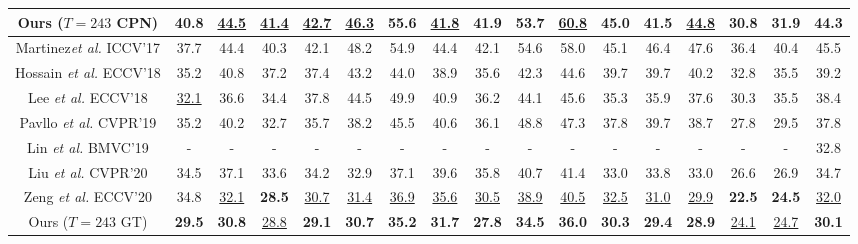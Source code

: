 \documentclass[sigconf]{acmart}
\begin{document}
\begin{table*}[ht]
\begin{tabular}{c|ccccccccccccccc|c}
    \midrule
    Ours ($T=243$ CPN)  &40.8&\underline{44.5}&\underline{41.4}&\underline{42.7}&\underline{46.3}&55.6&\underline{41.8}&41.9&53.7&\underline{60.8}&\textbf{45.0}&\textbf{41.5}&\underline{44.8}&\textbf{30.8}&\textbf{31.9}&\textbf{44.3}\\
    \midrule
    \midrule
    Martinez\textit{et al.} \cite{martinez2017simple} ICCV'17 &37.7&44.4&40.3&42.1&48.2&54.9&44.4&42.1&54.6&58.0&45.1&46.4&47.6&36.4&40.4&45.5 \\
    Hossain \textit{et al.} \cite{hossain2018exploiting} ECCV'18 &35.2&40.8&37.2&37.4&43.2&44.0&38.9&35.6&42.3&44.6&39.7&39.7&40.2&32.8&35.5&39.2  \\
    Lee \textit{et al.} \cite{lee2018propagating} ECCV'18 &\underline{32.1}&36.6&34.4&37.8&44.5&49.9&40.9&36.2&44.1&45.6&35.3&35.9&37.6&30.3&35.5&38.4  \\
    Pavllo \textit{et al.} \cite{jllo20193d} CVPR'19 &35.2&40.2&32.7&35.7&38.2&45.5&40.6&36.1&48.8&47.3&37.8&39.7&38.7&27.8&29.5&37.8  \\
    Lin \textit{et al.} \cite{lin2019trajectory} BMVC'19& -&-&-&-&-&-&-&-&-&-&-&-&-&-&-&32.8 \\
    Liu \textit{et al.} \cite{liu2020attention} CVPR'20 &34.5&37.1&33.6&34.2&32.9&37.1&39.6&35.8&40.7&41.4&33.0&33.8&33.0&26.6&26.9&34.7   \\
    Zeng \textit{et al.} \cite{zeng2020srnet} ECCV'20 &34.8&\underline{32.1}&\textbf{28.5}&\underline{30.7}&\underline{31.4}&\underline{36.9}&\underline{35.6}&\underline{30.5}&\underline{38.9}&\underline{40.5}&\underline{32.5}&\underline{31.0}&\underline{29.9}&\textbf{22.5}&\textbf{24.5}&\underline{32.0}   \\
    \midrule
    Ours ($T=243$ GT)  & \textbf{29.5}&\textbf{30.8}&\underline{28.8}&\textbf{29.1}&\textbf{30.7}&\textbf{35.2}&\textbf{31.7}&\textbf{27.8}&\textbf{34.5}&\textbf{36.0}&\textbf{30.3}&\textbf{29.4}&\textbf{28.9}&\underline{24.1}&\underline{24.7}&\textbf{30.1}\\
    \bottomrule
    \end{tabular}
  \label{tab1}
\end{table*}
\end{document}

